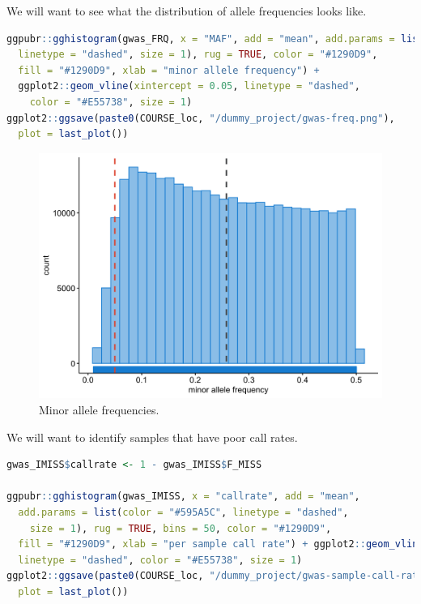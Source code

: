 \documentclass[
]{book}
\begin{document}
We will want to see what the distribution of allele frequencies looks like.

\begin{lstlisting}[language=R]
ggpubr::gghistogram(gwas_FRQ, x = "MAF", add = "mean", add.params = list(color = "#595A5C",
  linetype = "dashed", size = 1), rug = TRUE, color = "#1290D9",
  fill = "#1290D9", xlab = "minor allele frequency") +
  ggplot2::geom_vline(xintercept = 0.05, linetype = "dashed",
    color = "#E55738", size = 1)
ggplot2::ggsave(paste0(COURSE_loc, "/dummy_project/gwas-freq.png"),
  plot = last_plot())
\end{lstlisting}

\begin{figure}[H]

{\centering \includegraphics[width=18.67in]{img/_gwas_dummy/show-freq-gwas} 

}

\caption{Minor allele frequencies.}\label{fig:show-freq-gwas}
\end{figure}

We will want to identify samples that have poor call rates.

\begin{lstlisting}[language=R]
gwas_IMISS$callrate <- 1 - gwas_IMISS$F_MISS

ggpubr::gghistogram(gwas_IMISS, x = "callrate", add = "mean",
  add.params = list(color = "#595A5C", linetype = "dashed",
    size = 1), rug = TRUE, bins = 50, color = "#1290D9",
  fill = "#1290D9", xlab = "per sample call rate") + ggplot2::geom_vline(xintercept = 0.95,
  linetype = "dashed", color = "#E55738", size = 1)
ggplot2::ggsave(paste0(COURSE_loc, "/dummy_project/gwas-sample-call-rate.png"),
  plot = last_plot())
\end{lstlisting}
\end{document}

